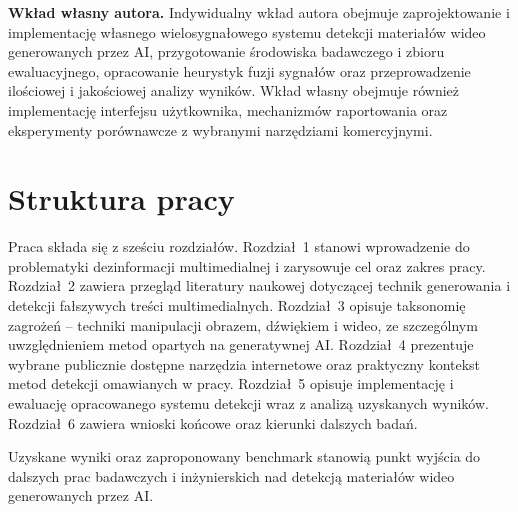 \noindent\textbf{Wkład własny autora.}
Indywidualny wkład autora obejmuje zaprojektowanie i implementację własnego
wielosygnałowego systemu detekcji materiałów wideo generowanych przez AI,
przygotowanie środowiska badawczego i zbioru ewaluacyjnego, opracowanie
heurystyk fuzji sygnałów oraz przeprowadzenie ilościowej i jakościowej analizy wyników.
Wkład własny obejmuje również implementację interfejsu użytkownika,
mechanizmów raportowania oraz eksperymenty porównawcze z wybranymi narzędziami komercyjnymi.

\section*{Struktura pracy}

Praca składa się z sześciu rozdziałów.
Rozdział~1 stanowi wprowadzenie do problematyki dezinformacji multimedialnej i zarysowuje cel oraz zakres pracy.
Rozdział~2 zawiera przegląd literatury naukowej dotyczącej technik generowania i detekcji fałszywych treści multimedialnych.
Rozdział~3 opisuje taksonomię zagrożeń -- techniki manipulacji obrazem, dźwiękiem i wideo, ze szczególnym uwzględnieniem metod opartych na generatywnej AI.
Rozdział~4 prezentuje wybrane publicznie dostępne narzędzia internetowe oraz praktyczny kontekst metod detekcji omawianych w pracy.
Rozdział~5 opisuje implementację i ewaluację opracowanego systemu detekcji wraz z analizą uzyskanych wyników.
Rozdział~6 zawiera wnioski końcowe oraz kierunki dalszych badań.

Uzyskane wyniki oraz zaproponowany benchmark stanowią punkt wyjścia do dalszych prac badawczych i inżynierskich nad detekcją materiałów wideo generowanych przez AI.

